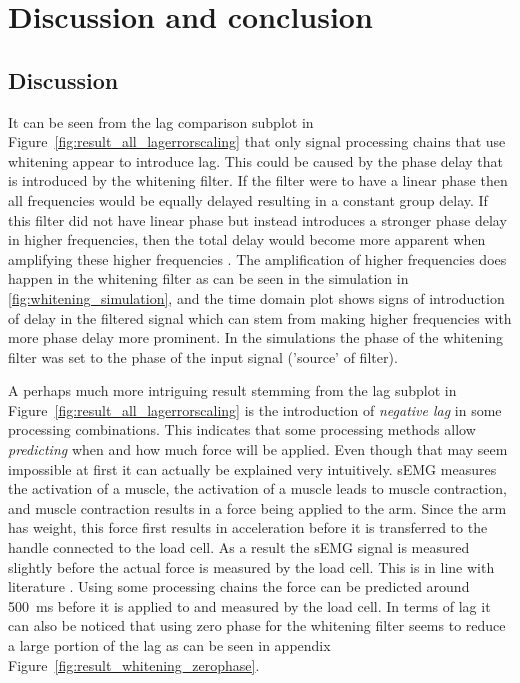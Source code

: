 \chapter{Discussion and conclusion}
\section{Discussion}\label{sec:discussion}
It can be seen from the lag comparison subplot in Figure~\ref{fig:result_all_lagerrorscaling} that only signal processing chains that use whitening appear to introduce lag. This could be caused by the phase delay that is introduced by the whitening filter. If the filter were to have a linear phase then all frequencies would be equally delayed resulting in a constant group delay. If this filter did not have linear phase but instead introduces a stronger phase delay in higher frequencies, then the total delay would become more apparent when amplifying these higher frequencies \cite{phase_delay_frequencies}. The amplification of higher frequencies does happen in the whitening filter as can be seen in the simulation in \ref{fig:whitening_simulation}, and the time domain plot shows signs of introduction of delay in the filtered signal which can stem from making higher frequencies with more phase delay more prominent. In the simulations the phase of the whitening filter was set to the phase of the input signal ('source' of filter).

A perhaps much more intriguing result stemming from the lag subplot in Figure~\ref{fig:result_all_lagerrorscaling} is the introduction of \textit{negative lag} in some processing combinations. This indicates that some processing methods allow \textit{predicting} when and how much force will be applied. Even though that may seem impossible at first it can actually be explained very intuitively. sEMG measures the activation of a muscle, the activation of a muscle leads to muscle contraction, and muscle contraction results in a force being applied to the arm. Since the arm has weight, this force first results in acceleration before it is transferred to the handle connected to the load cell. As a result the sEMG signal is measured slightly before the actual force is measured by the load cell. This is in line with literature \cite{human_robotics}. Using some processing chains the force can be predicted around \SI{500}{\milli\second} before it is applied to and measured by the load cell. In terms of lag it can also be noticed that using zero phase for the whitening filter seems to reduce a large portion of the lag as can be seen in appendix Figure~\ref{fig:result_whitening_zerophase}.

